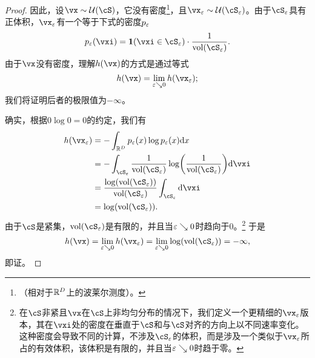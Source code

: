 \documentclass[../../book-main_zh.tex]{subfiles}
\begin{document}
\begin{proof}
    因此，设\(\vx \sim \dUnif(\cS)\)，它没有密度\footnote{（相对于\(\mathbb{R}^{D}\)上的波莱尔测度）。}，且\(\vx_{\eps} \sim \dUnif(\cS_{\eps})\)。由于\(\cS_{\eps}\)具有正体积，\(\vx_{\eps}\)有一个等于下式的密度\(p_{\varepsilon}\)
    \begin{equation}
        p_{\eps}(\vxi) = \indvar(\vxi \in \cS_{\eps}) \cdot \frac{1}{\volume(\cS_{\eps})}.
    \end{equation}
    由于\(\vx\)没有密度，理解\(h(\vx)\)的方式是通过等式
    \begin{equation}
        h(\vx) = \lim_{\eps \searrow 0}h(\vx_{\eps});
    \end{equation}
    我们将证明后者的极限值为\(-\infty\)。

    确实，根据\(0 \log 0 = 0\)的约定，我们有
    \begin{align}
        h(\vx_{\eps}) 
        &= -\int_{\R^{D}}p_{\eps}(x)\log p_{\eps}(x)\odif{x} \\ 
        &= -\int_{\cS_{\eps}}\frac{1}{\volume(\cS_{\eps})} \log\rp{\frac{1}{\volume(\cS_{\eps})}}\odif{\vxi} \\ 
        &= \frac{\log(\volume(\cS_{\eps}))}{\volume(\cS_{\eps})}\int_{\cS_{\eps}}\odif{\vxi} \\ 
        &= \log(\volume(\cS_{\eps})).
    \end{align}
    由于\(\cS\)是紧集，\(\volume(\cS_{\eps})\)是有限的，并且当\(\varepsilon \searrow 0\)时趋向于\(0\)。\footnote{在\(\cS\)非紧且\(\vx\)在\(\cS\)上非均匀分布的情况下，我们定义一个更精细的\(\vx_{\eps}\)版本，其在\(\vxi\)处的密度在垂直于\(\cS\)和与\(\cS\)对齐的方向上以不同速率变化。这种密度会导致不同的计算，不涉及\(\cS_{\eps}\)的体积，而是涉及一个类似于\(\vx_{\eps}\)所占的有效体积，该体积是有限的，并且当\(\varepsilon \searrow 0\)时趋于零。} 于是
    \begin{equation}
        h(\vx) = \lim_{\eps \searrow 0}h(\vx_{\eps}) = \lim_{\eps \searrow 0}\log(\volume(\cS_{\eps})) = -\infty,
    \end{equation}
    即证。
\end{proof}
\end{document}
